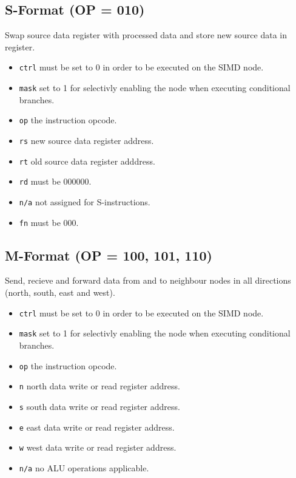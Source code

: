 

\subsection[S-Format]{S-Format (OP = 010)}
Swap source data register with processed data and store new source data in
register.



\begin{itemize}
\item {\tt ctrl} must be set to 0 in order to be executed on the SIMD node.
\item {\tt mask} set to 1 for selectivly enabling the node when executing
  conditional branches.
\item {\tt op} the instruction opcode.
\item {\tt rs} new source data register address.
\item {\tt rt} old source data register adddress.
\item {\tt rd} must be 000000.
\item {\tt n/a} not assigned for S-instructions.
\item {\tt fn} must be 000.
\end{itemize}



\subsection[M-Format]{M-Format (OP = 100, 101, 110)}
Send, recieve and forward data from and to neighbour nodes in all directions (north, south, east and west).



\begin{itemize}
\item {\tt ctrl} must be set to 0 in order to be executed on the SIMD node.
\item {\tt mask} set to 1 for selectivly enabling the node when executing
  conditional branches.
\item {\tt op} the instruction opcode.
\item {\tt n} north data write or read register address.
\item {\tt s} south data write or read register address.
\item {\tt e} east data write or read register address.
\item {\tt w} west data write or read register address.
\item {\tt n/a} no ALU operations applicable.
\end{itemize}

